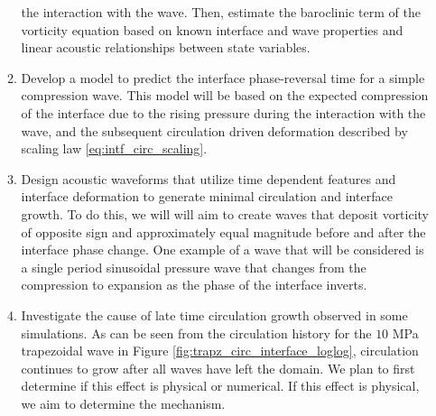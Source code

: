 \begin{itemize}
\begin{enumerate}
    the interaction with the wave. Then, estimate the baroclinic term
    of the vorticity equation based on known interface and wave
    properties and linear acoustic relationships between state
    variables.
  \item Develop a model to predict the interface phase-reversal time
    for a simple compression wave. This model will be based on the
    expected compression of the interface due to the rising pressure
    during the interaction with the wave, and the subsequent
    circulation driven deformation described by scaling law
    \eqref{eq:intf_circ_scaling}.
  \item Design acoustic waveforms that utilize time dependent features
    and interface deformation to generate minimal circulation and
    interface growth. To do this, we will will aim to create waves
    that deposit vorticity of opposite sign and approximately equal
    magnitude before and after the interface phase change. One example
    of a wave that will be considered is a single period sinusoidal
    pressure wave that changes from the compression to expansion as
    the phase of the interface inverts.
  \item Investigate the cause of late time circulation growth observed
    in some simulations. As can be seen from the circulation history
    for the $10$ MPa trapezoidal wave in Figure
    \ref{fig:trapz_circ_interface_loglog}, circulation continues to
    grow after all waves have left the domain. We plan to first
    determine if this effect is physical or numerical. If this effect
    is physical, we aim to determine the mechanism.
  \end{enumerate}
\end{itemize}






